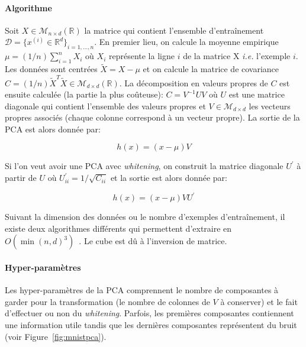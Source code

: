 \paragraph{Algorithme} Soit $X\in\mathcal{M}_{n\times d}(\mathbb{R})$ la
matrice qui contient l'ensemble d'entraînement $\mathcal{D}=\lbrace
x^{(i)}\in\mathbb{R}^d \rbrace_{i=1,\dots,n}$.  En premier lieu, on calcule la
moyenne empirique $\mu=(1/n)\sum_{i=1}^{n}X_i$ où $X_i$ représente la ligne $i$
de la matrice X \textit{i.e.} l'exemple $i$. Les données sont centrées
$\tilde{X}=X-\mu$ et on calcule la matrice de covariance
$C=(1/n)\tilde{X}^T\tilde{X}\in\mathcal{M}_{d\times d}(\mathbb{R})$. La décomposition en valeurs propres de $C$ est
ensuite calculée (la partie la plus co\^uteuse): $C=V^{-1}UV$ où
$U$ est une matrice diagonale qui contient l'ensemble des valeurs propres
et $V\in\mathcal{M}_{d\times d}$ les vecteurs propres associés (chaque colonne
correspond à un vecteur propre). La sortie de la PCA est alors donnée par:

\begin{equation}
h(x)=(x-\mu)V
\end{equation}

Si l'on veut avoir une PCA avec \textit{whitening}, on construit la matrice
diagonale $U^{'}$ à partir de $U$ où $U^{'}_{ii}=1/\sqrt{C_{ii}}$ et la sortie
est alors donnée par:

\begin{equation}
h(x)=(x-\mu)VU^{'}
\end{equation}


Suivant la dimension des données ou le nombre d'exemples d'entraînement, il
existe deux algorithmes différents qui permettent d'extraire en
$O(\min(n,d)^3)$~\citep{bishop-book2006}.  Le cube est dû à l'inversion de
matrice.

\paragraph{Hyper-paramètres} Les hyper-paramètres de la PCA comprennent le
nombre de composantes à garder pour la transformation (le nombre de colonnes de
$V$ à conserver) et le fait d'effectuer ou non du \textit{whitening}. Parfois,
les premières composantes contiennent une information utile tandis que les
dernières composantes représentent du bruit (voir Figure~\ref{fig:mnistpca}).


